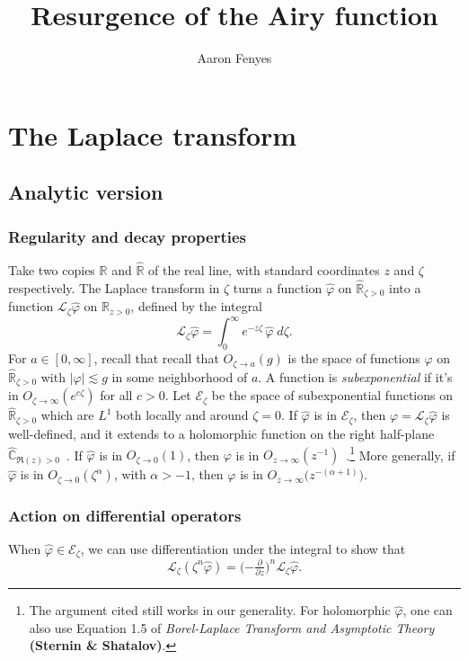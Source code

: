 \documentclass{article}
\title{Resurgence of the Airy function}
\author{Aaron Fenyes}
\newcommand{\R}{\mathbb{R}}
\newcommand{\C}{\mathbb{C}}
\newcommand{\laplace}{\mathcal{L}}
\begin{document}
\maketitle
\section{The Laplace transform}
\subsection{Analytic version}
\subsubsection{Regularity and decay properties}\label{reg-decay}
Take two copies $\R$ and $\hat{\R}$ of the real line, with standard coordinates $z$ and $\zeta$ respectively. The Laplace transform in $\zeta$ turns a function $\hat{\varphi}$ on $\hat{\R}_{\zeta > 0}$ into a function $\laplace_\zeta \hat{\varphi}$ on $\R_{z > 0}$, defined by the integral
\[ \laplace_\zeta \hat{\varphi} = \int_0^\infty e^{-z \zeta}\,\hat{\varphi}\;d\zeta. \]
For $a \in [0, \infty]$, recall that recall that $O_{\zeta \to a}(g)$ is the space of functions $\varphi$ on $\hat{\R}_{\zeta > 0}$ with $|\varphi| \lesssim g$ in some neighborhood of $a$. A function is {\em subexponential} if it's in $O_{\zeta \to \infty}(e^{c\zeta})$ for all $c > 0$. Let $\mathcal{E}_\zeta$ be the space of subexponential functions on $\hat{\R}_{\zeta > 0}$ which are $L^1$ both locally and around $\zeta = 0$. If $\hat{\varphi}$ is in $\mathcal{E}_\zeta$, then $\varphi = \laplace_\zeta \hat{\varphi}$ is well-defined, and it extends to a holomorphic function on the right half-plane $\hat{\C}_{\Re(z) > 0}$~\cite[\S 5.6]{diverg-resurg-i}. If $\hat{\varphi}$ is in $O_{\zeta \to 0}(1)$, then $\varphi$ is in $O_{z \to \infty}(z^{-1})$~\cite[equation~1.8]{laplace-tfm}.\footnote{The argument cited still works in our generality. For holomorphic $\hat{\varphi}$, one can also use Equation 1.5 of {\em Borel-Laplace Transform and Asymptotic Theory} \textbf{(Sternin \& Shatalov)}.} More generally, if $\hat{\varphi}$ is in $O_{\zeta \to 0}(\zeta^{\alpha})$, with $\alpha > -1$, then $\varphi$ is in $O_{z \to \infty}\big(z^{-(\alpha + 1)}\big)$.
\subsubsection{Action on differential operators}\label{L-diff-op}
When $\hat{\varphi} \in \mathcal{E}_\zeta$, we can use differentiation under the integral to show that~\cite[Theorem~1.34]{laplace-tfm}
\begin{equation}\label{id:L-mult}
\laplace_\zeta (\zeta^n \hat{\varphi}) = \big({-\tfrac{\partial}{\partial z}}\big)^n \laplace_\zeta \hat{\varphi}.
\end{equation}
\end{document}
